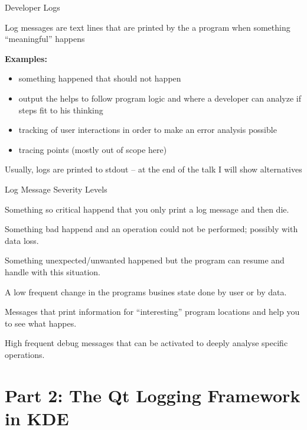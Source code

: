 \documentclass[t,compress,aspectratio=169]{beamer}
\begin{document}
\begin{frame}
    {Developer Logs}

    Log messages are text lines that are printed by the a program when something ``meaningful'' happens
    \medskip

    \textbf{Examples:}
    \begin{itemize}
        \item something happened that should not happen
        \item output the helps to follow program logic and where a developer can analyze if steps fit to his thinking
        \item tracking of user interactions in order to make an error analysis possible
        \item tracing points (mostly out of scope here)
    \end{itemize}
    \medskip

    Usually, logs are printed to stdout -- at the end of the talk I will show alternatives
\end{frame}

\begin{frame}
    {Log Message Severity Levels}

    \begin{description}
        \item[Fatal] Something so critical happend that you only print a log message and then die.
        \item<2->[Critical] Something bad happend and an operation could not be performed; possibly with data loss.
        \item<3->[Warning] Something unexpected/unwanted happened but the program can resume and handle with this situation.
        \item<4->[Info] A low frequent change in the programs busines state done by user or by data.
        \item<5->[Debug] Messages that print information for ``interesting'' program locations and help you to see what happes.
        \item<6->[Trace] High frequent debug messages that can be activated to deeply analyse specific operations.
    \end{description}
\end{frame}

\section{Part 2: The Qt Logging Framework in KDE}
\end{document}
